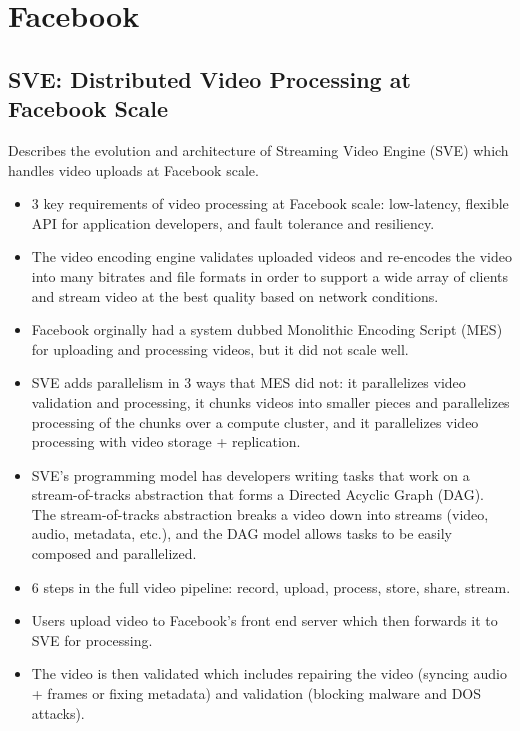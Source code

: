 \documentclass[a4paper]{article}
\begin{document}
\section{Facebook}

\subsection{SVE: Distributed Video Processing at Facebook Scale}

Describes the evolution and architecture of Streaming Video Engine (SVE) which handles video uploads at Facebook scale.

\begin{itemize}
\item 3 key requirements of video processing at Facebook scale: low-latency, flexible API for application developers, and fault tolerance and resiliency. 

\item The video encoding engine validates uploaded videos and re-encodes the video into many bitrates and file formats in order to support a wide array of clients and stream video at the best quality based on network conditions.

\item Facebook orginally had a system dubbed Monolithic Encoding Script (MES) for uploading and processing videos, but it did not scale well.

\item SVE adds parallelism in 3 ways that MES did not: it parallelizes video validation and processing, it chunks videos into smaller pieces and parallelizes processing of the chunks over a compute cluster, and it parallelizes video processing with video storage + replication.

\item SVE's programming model has developers writing tasks that work on a stream-of-tracks abstraction that forms a Directed Acyclic Graph (DAG). The stream-of-tracks abstraction breaks a video down into streams (video, audio, metadata, etc.), and the DAG model allows tasks to be easily composed and parallelized.

\item 6 steps in the full video pipeline: record, upload, process, store, share, stream.

\item Users upload video to Facebook's front end server which then forwards it to SVE for processing.

\item The video is then validated which includes repairing the video (syncing audio + frames or fixing metadata) and validation (blocking malware and DOS attacks).


\end{itemize}
\end{document}
